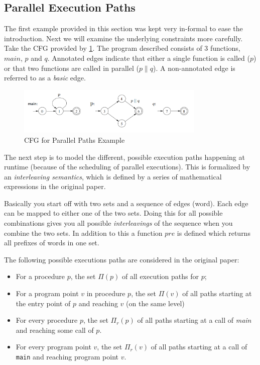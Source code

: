 \documentclass[article]{uibk}
\begin{document}
\subsection{Parallel Execution Paths}

The first example provided in this section was kept very in-formal to ease the
introduction. Next we will examine the underlying constraints more carefully.
Take the CFG provided by \cref{fig:parallel_paths}. The program described
consists of 3 functions, $main$, $p$ and $q$. Annotated edges indicate that
either a single function is called ($p$) or that two functions are called in
parallel ($p \parallel q$). A non-annotated edge is referred to as a
\textit{basic} edge.~\cite{parallel_cba}

\begin{figure}[H]
    \centering
    \includegraphics[width=0.8\textwidth]{gfx/parallel_paths.png}
    \caption{CFG for Parallel Paths Example}
    \label{fig:parallel_paths}
\end{figure}

The next step is to model the different, possible execution paths happening at
runtime (because of the scheduling of parallel executions). This is formalized
by an \textit{interleaving semantics}, which is defined by a series of
mathematical expressions in the original paper.~\cite{parallel_cba}

Basically you start off with two sets and a sequence of edges (word). Each edge
can be mapped to either one of the two sets. Doing this for all possible
combinations gives you all possible \textit{interleavings} of the sequence when
you combine the two sets. In addition to this a function $pre$ is defined which
returns all prefixes of words in one set.

The following possible executions paths are considered in the original paper:


\begin{itemize}
    \item For a procedure $p$, the set $\Pi(p)$ of all execution paths for $p$;
    \item For a program point $v$ in procedure $p$, the set $\Pi(v)$ of all
        paths starting at the entry point of $p$ and reaching $v$ (on the same
        level)
    \item For every procedure $p$, the set $\Pi_r(p)$ of all paths starting at
        a call of \textit{main} and reaching some call of $p$.
    \item For every program point $v$, the set $\Pi_r(v)$ of all paths starting
        at a call of \texttt{main} and reaching program point $v$.
\end{itemize}
\end{document}
